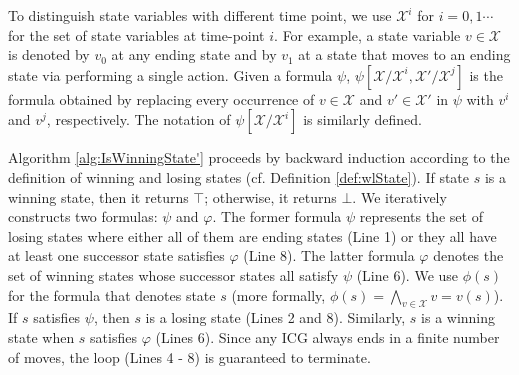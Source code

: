 \documentclass[review]{elsarticle}
\newcommand{\true}{\top}
\newcommand{\false}{\bot}
\newcommand{\statevar}{\mathcal{X}}
\begin{document}
	To distinguish state variables with different time point, we use $\statevar^{i}$ for $i = 0, 1 \cdots$ for the set of state variables at time-point $i$.
	For example, a state variable $v \in \statevar$ is denoted by $v_0$ at any ending state and by $v_1$ at a state that moves to an ending state via performing a single action.
	Given a formula $\psi$, $\psi[\statevar/\statevar^i,\statevar'/\statevar^j]$ is the formula obtained by replacing every occurrence of $v \in \statevar$ and $v' \in \statevar'$ in $\psi$ with $v^i$ and $v^j$, respectively.
	The notation of $\psi[\statevar/\statevar^i]$ is similarly defined.
	
	Algorithm \ref{alg:IsWinningState'} proceeds by backward induction according to the definition of winning and losing states (cf. Definition \ref{def:wlState}).
	If state $s$ is a winning state, then it returns $\true$; otherwise, it returns $\false$.
	We iteratively constructs two formulas: $\psi$ and $\varphi$.
	The former formula $\psi$ represents the set of losing states where either all of them are ending states (Line 1) or they all have at least one successor state satisfies $\varphi$ (Line 8).
	The latter formula $\varphi$ denotes the set of winning states whose successor states all satisfy $\psi$ (Line 6).
	We use $\phi(s)$ for the formula that denotes state $s$ (more formally, $\phi(s) = \bigwedge_{v \in \statevar} v = v(s)$).
	If $s$ satisfies $\psi$, then $s$ is a losing state (Lines 2 and 8).
	Similarly, $s$ is a winning state when $s$ satisfies $\varphi$ (Lines 6).		
	Since any ICG always ends in a finite number of moves, the loop (Lines 4 - 8) is guaranteed to terminate.
\end{document}
